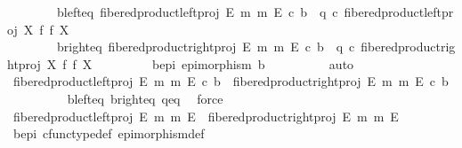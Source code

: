 \begin{isabellebody}
\ \ \ \ \ \ \ \ b{\isacharunderscore}{\kern0pt}left{\isacharunderscore}{\kern0pt}eq{\isacharcolon}{\kern0pt}\ {\isachardoublequoteopen}fibered{\isacharunderscore}{\kern0pt}product{\isacharunderscore}{\kern0pt}left{\isacharunderscore}{\kern0pt}proj\ E\ m\ m\ E\ {\isasymcirc}\isactrlsub c\ b\ {\isacharequal}{\kern0pt}\ q\ {\isasymcirc}\isactrlsub c\ fibered{\isacharunderscore}{\kern0pt}product{\isacharunderscore}{\kern0pt}left{\isacharunderscore}{\kern0pt}proj\ X\ f\ f\ X{\isachardoublequoteclose}\ \isanewline
\ \ \ \ \ \ \ \ b{\isacharunderscore}{\kern0pt}right{\isacharunderscore}{\kern0pt}eq{\isacharcolon}{\kern0pt}\ {\isachardoublequoteopen}fibered{\isacharunderscore}{\kern0pt}product{\isacharunderscore}{\kern0pt}right{\isacharunderscore}{\kern0pt}proj\ E\ m\ m\ E\ {\isasymcirc}\isactrlsub c\ b\ {\isacharequal}{\kern0pt}\ q\ {\isasymcirc}\isactrlsub c\ fibered{\isacharunderscore}{\kern0pt}product{\isacharunderscore}{\kern0pt}right{\isacharunderscore}{\kern0pt}proj\ X\ f\ f\ X{\isachardoublequoteclose}\ \isanewline
\ \ \ \ \ \ \ \ b{\isacharunderscore}{\kern0pt}epi{\isacharcolon}{\kern0pt}\ {\isachardoublequoteopen}epimorphism\ b{\isachardoublequoteclose}\isanewline
\ \ \ \ \ \ \ \ \isamarkupfalse%
\ auto\isanewline
\isanewline
\ \ \ \ \ \ \isamarkupfalse%
\ {\isachardoublequoteopen}fibered{\isacharunderscore}{\kern0pt}product{\isacharunderscore}{\kern0pt}left{\isacharunderscore}{\kern0pt}proj\ E\ m\ m\ E\ {\isasymcirc}\isactrlsub c\ b\ {\isacharequal}{\kern0pt}\ fibered{\isacharunderscore}{\kern0pt}product{\isacharunderscore}{\kern0pt}right{\isacharunderscore}{\kern0pt}proj\ E\ m\ m\ E\ {\isasymcirc}\isactrlsub c\ b{\isachardoublequoteclose}\isanewline
\ \ \ \ \ \ \ \ \isamarkupfalse%
\ b{\isacharunderscore}{\kern0pt}left{\isacharunderscore}{\kern0pt}eq\ b{\isacharunderscore}{\kern0pt}right{\isacharunderscore}{\kern0pt}eq\ q{\isacharunderscore}{\kern0pt}eq\ \isamarkupfalse%
\ force\isanewline
\ \ \ \ \ \ \isamarkupfalse%
\ \isamarkupfalse%
\ {\isachardoublequoteopen}fibered{\isacharunderscore}{\kern0pt}product{\isacharunderscore}{\kern0pt}left{\isacharunderscore}{\kern0pt}proj\ E\ m\ m\ E\ {\isacharequal}{\kern0pt}\ fibered{\isacharunderscore}{\kern0pt}product{\isacharunderscore}{\kern0pt}right{\isacharunderscore}{\kern0pt}proj\ E\ m\ m\ E{\isachardoublequoteclose}\isanewline
\ \ \ \ \ \ \ \ \isamarkupfalse%
\ b{\isacharunderscore}{\kern0pt}epi\ cfunc{\isacharunderscore}{\kern0pt}type{\isacharunderscore}{\kern0pt}def\ epimorphism{\isacharunderscore}{\kern0pt}def\ \isamarkupfalse%

\end{isabellebody}
